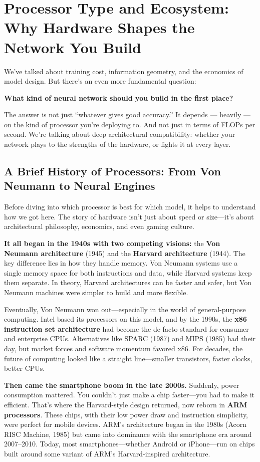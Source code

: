 \section{Processor Type and Ecosystem: Why Hardware Shapes the Network You Build}

We’ve talked about training cost, information geometry, and the economics of model design. But there’s an even more fundamental question:

\textbf{What kind of neural network should you build in the first place?}

The answer is not just “whatever gives good accuracy.” It depends — heavily — on the kind of processor you’re deploying to. And not just in terms of FLOPs per second. We're talking about deep architectural compatibility: whether your network plays to the strengths of the hardware, or fights it at every layer.
\subsection{A Brief History of Processors: From Von Neumann to Neural Engines}

Before diving into which processor is best for which model, it helps to understand how we got here. The story of hardware isn’t just about speed or size—it’s about architectural philosophy, economics, and even gaming culture.

\medskip

\noindent\textbf{It all began in the 1940s with two competing visions:} the \textbf{Von Neumann architecture} (1945) and the \textbf{Harvard architecture} (1944). The key difference lies in how they handle memory. Von Neumann systems use a single memory space for both instructions and data, while Harvard systems keep them separate. In theory, Harvard architectures can be faster and safer, but Von Neumann machines were simpler to build and more flexible.

Eventually, Von Neumann won out—especially in the world of general-purpose computing. Intel based its processors on this model, and by the 1990s, the \textbf{x86 instruction set architecture} had become the de facto standard for consumer and enterprise CPUs. Alternatives like SPARC (1987) and MIPS (1985) had their day, but market forces and software momentum favored x86. For decades, the future of computing looked like a straight line—smaller transistors, faster clocks, better CPUs.

\medskip

\noindent\textbf{Then came the smartphone boom in the late 2000s.} Suddenly, power consumption mattered. You couldn’t just make a chip faster—you had to make it efficient. That’s where the Harvard-style design returned, now reborn in \textbf{ARM processors}. These chips, with their low power draw and instruction simplicity, were perfect for mobile devices. ARM’s architecture began in the 1980s (Acorn RISC Machine, 1985) but came into dominance with the smartphone era around 2007–2010. Today, most smartphones—whether Android or iPhone—run on chips built around some variant of ARM’s Harvard-inspired architecture.

